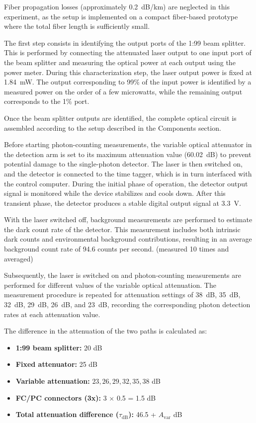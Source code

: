 Fiber propagation losses (approximately 0.2~dB/km) are neglected in
this experiment, as the setup is implemented on a compact fiber-based
prototype where the total fiber length is sufficiently small.

The first step consists in identifying the output ports of the 1:99
beam splitter. This is performed by connecting the attenuated laser
output to one input port of the beam splitter and measuring the
optical power at each output using the power meter. During this
characterization step, the laser output power is fixed at 1.84~mW.
The output corresponding to 99\% of the input power is identified by
a measured power on the order of a few microwatts, while the
remaining output corresponds to the 1\% port.

Once the beam splitter outputs are identified, the complete optical
circuit is assembled according to the setup described in the Components section.

Before starting photon-counting measurements, the variable optical
attenuator in the detection arm is set to its maximum attenuation
value (60.02~dB) to prevent potential damage to the single-photon
detector. The laser is then switched on, and the detector is
connected to the time tagger, which is in turn interfaced with the
control computer. During the initial phase of operation, the detector
output signal is monitored while the device stabilizes and cools
down. After this transient phase, the detector produces a stable
digital output signal at 3.3~V.

With the laser switched off, background measurements are performed to
estimate the dark count rate of the detector. This measurement
includes both intrinsic dark counts and environmental background
contributions, resulting in an average background count rate of 94.6
counts per second. (measured 10 times and averaged)

Subsequently, the laser is switched on and photon-counting
measurements are performed for different values of the variable
optical attenuation. The measurement procedure is repeated for
attenuation settings of 38~dB, 35~dB, 32~dB, 29~dB, 26~dB, and 23~dB,
recording the corresponding photon detection rates at each attenuation value.

The difference in the attenuation of the two paths is calculated as:

\begin{itemize}
  \item \textbf{1:99 beam splitter:} 20 dB
  \item \textbf{Fixed attenuator:} 25 dB
  \item \textbf{Variable attenuation:} $23, 26, 29, 32, 35, 38$ dB
  \item \textbf{FC/PC connectors (3x):} 3 $\times$ 0.5 = 1.5 dB
  \item \textbf{Total attenuation difference ($\tau_{\text{dB}}$):}
    46.5 + $A_{\text{var}}$ dB
\end{itemize}

